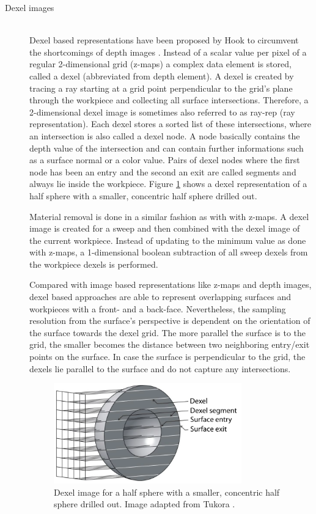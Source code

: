 \begin{description}
	\item[Dexel images] \hfill \\
	Dexel based representations have been proposed by Hook to circumvent the shortcomings of depth images \cite{dexel}.
	Instead of a scalar value per pixel of a regular 2-dimensional grid (z-maps) a complex data element is stored, called a dexel (abbreviated from depth element).
	A dexel is created by tracing a ray starting at a grid point perpendicular to the grid's plane through the workpiece and collecting all surface intersections.
	Therefore, a 2-dimensional dexel image is sometimes also referred to as ray-rep (ray representation).
	Each dexel stores a sorted list of these intersections, where an intersection is also called a dexel node.
	A node basically contains the depth value of the intersection and can contain further informations such as a surface normal or a color value.
	Pairs of dexel nodes where the first node has been an entry and the second an exit are called segments and always lie inside the workpiece.
	Figure \ref{fig:dexel_image} shows a dexel representation of a half sphere with a smaller, concentric half sphere drilled out.
	
	Material removal is done in a similar fashion as with with z-maps.
	A dexel image is created for a sweep and then combined with the dexel image of the current workpiece.
	Instead of updating to the minimum value as done with z-maps, a 1-dimensional boolean subtraction of all sweep dexels from the workpiece dexels is performed.
	
	Compared with image based representations like z-maps and depth images, dexel based approaches are able to represent overlapping surfaces and workpieces with a front- and a back-face.
	Nevertheless, the sampling resolution from the surface's perspective is dependent on the orientation of the surface towards the dexel grid.
	The more parallel the surface is to the grid, the smaller becomes the distance between two neighboring entry/exit points on the surface.
	In case the surface is perpendicular to the grid, the dexels lie parallel to the surface and do not capture any intersections.
		
	\begin{figure}[H]
		\centering
		\includegraphics[width=0.8\textwidth]{images/dexels}
		\caption{
			Dexel image for a half sphere with a smaller, concentric half sphere drilled out.
			Image adapted from Tukora \cite{virtual_machining_review}.
		}
		\label{fig:dexel_image}
	\end{figure}
		

\end{description}
